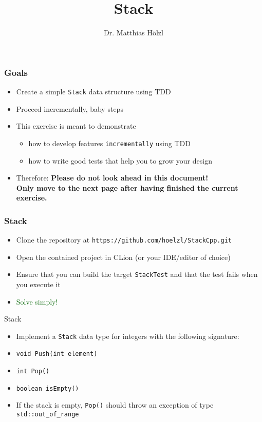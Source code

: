 \documentclass[10pt,aspectratio=169]{beamer}
\begin{document}
\title[Stack]{%
  Stack}
\author{Dr. Matthias Hölzl}

\begin{frame}
  \maketitle
\end{frame}

\begin{frame}[fragile]
  \frametitle{Goals}
  \begin{itemize}
  \item Create a simple \texttt{Stack} data structure using TDD
  \item Proceed incrementally, baby steps\\[1ex]
  
  \item This exercise is meant to demonstrate
    \begin{itemize}
    \item how to develop features \texttt{incrementally} using TDD
    \item how to write good tests that help you to grow your design 
    \end{itemize}
  \item Therefore: \textbf{Please do not look ahead in this document!\\
      Only move to the next page after having finished the current
      exercise.}
  \end{itemize}
\end{frame}


\begin{frame}[fragile]
  \frametitle{Stack}
  \begin{itemize}
  \item Clone the repository at
    \texttt{https://github.com/hoelzl/StackCpp.git}
  \item Open the contained project in CLion (or your IDE/editor of choice)
  \item Ensure that you can build the target \texttt{StackTest} and
    that the test fails when you execute it
  \end{itemize}
  \bigskip
  \begin{itemize}
  \item \textcolor{darkgreen}{Solve simply!}
  \end{itemize}
\end{frame}

\begin{frame}[fragile]{Stack}
\begin{itemize}
\item Implement a \texttt{Stack} data type for integers with the
  following signature:
\item \texttt{void Push(int element)}
\item \texttt{int Pop()}
\item \texttt{boolean isEmpty()}
\item If the stack is empty, \texttt{Pop()} should throw an exception
  of type \verb!std::out_of_range!
\end{itemize}
\end{frame}
\end{document}
